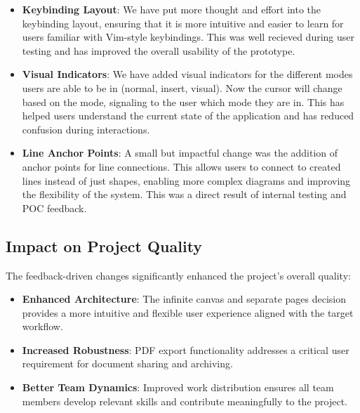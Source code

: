 \documentclass[12pt, titlepage]{article}
\begin{document}
\begin{itemize}
\item \textbf{Keybinding Layout}: We have put more thought and effort into the keybinding layout,
ensuring that it is more intuitive and easier to learn for users familiar with Vim-style keybindings.
This was well recieved during user testing and has improved the overall usability of the prototype.

\item \textbf{Visual Indicators}: We have added visual indicators for the different modes users are able
to be in (normal, insert, visual). Now the cursor will change based on the mode, signaling to
the user which mode they are in. This has helped users understand the current state of the application
and has reduced confusion during interactions.

\item \textbf{Line Anchor Points}: A small but impactful change was the addition of anchor points for line connections.
This allows users to connect to created lines instead of just shapes, enabling more complex diagrams and improving the
flexibility of the system. This was a direct result of internal testing and POC feedback.

\end{itemize}

\subsection{Impact on Project Quality}

The feedback-driven changes significantly enhanced the project's overall
quality:

\begin{itemize}
\item \textbf{Enhanced Architecture}: The infinite canvas and separate
  pages decision provides a more intuitive and flexible user experience
  aligned with the target workflow.

\item \textbf{Increased Robustness}: PDF export functionality addresses
  a critical user requirement for document sharing and archiving.

\item \textbf{Better Team Dynamics}: Improved work distribution ensures
  all team members develop relevant skills and contribute meaningfully
  to the project.

\end{itemize}
\end{document}
